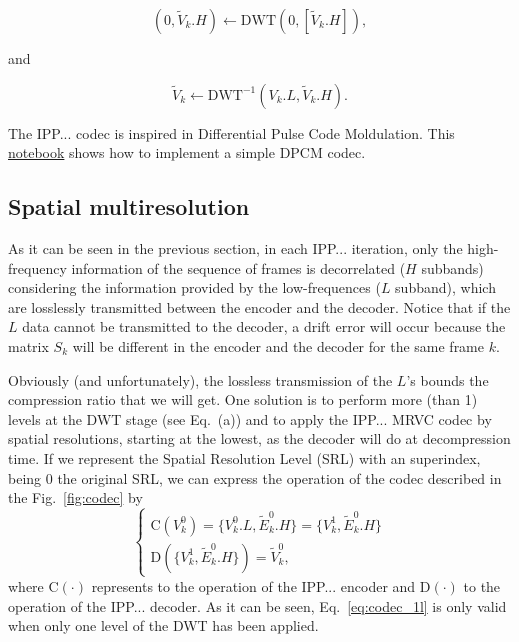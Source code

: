 \begin{equation}
  (0, \tilde{V}_k.H) \leftarrow \text{DWT}(0, [\tilde{V}_k.H]),
  \tag{j}
\end{equation}

and

\begin{equation}
  \tilde{V}_k \leftarrow \text{DWT}^{-1}(V_k.L, \tilde{V}_k.H).
  \tag{k}
\end{equation}

The IPP... codec is inspired in Differential Pulse Code Moldulation.
This
\href{https://github.com/Sistemas-Multimedia/Sistemas-Multimedia.github.io/blob/master/milestones/12-IPP_coding/DPCM.ipynb}{notebook}
shows how to implement a simple DPCM codec.

\subsection{Spatial multiresolution}
As it can be seen in the previous section, in each IPP... iteration,
only the high-frequency information of the sequence of frames is
decorrelated ($H$ subbands) considering the information provided by
the low-frequences ($L$ subband), which are losslessly transmitted
between the encoder and the decoder. Notice that if the $L$ data
cannot be transmitted to the decoder, a drift error will occur because
the matrix $S_k$ will be different in the encoder and the decoder for
the same frame $k$.

Obviously (and unfortunately), the lossless transmission of the $L$'s
bounds the compression ratio that we will get. One solution is to
perform more (than 1) levels at the DWT stage (see Eq.~(a)) and to
apply the IPP... MRVC codec by spatial resolutions, starting at the
lowest, as the decoder will do at decompression time. If we represent
the Spatial Resolution Level (SRL) with an superindex, being 0 the
original SRL, we can express the operation of the codec described in
the Fig.~\ref{fig:codec} by
\begin{equation}
  \left\{
    \begin{array}{l}
      \text{C}(V^0_k) = \{V^0_k.L, \tilde{E}^0_k.H\} = \{V^1_k, \tilde{E}^0_k.H\} \\
      \text{D}(\{V^1_k, \tilde{E}^0_k.H\}) = \tilde{V}^0_k,
    \end{array}
  \right.
  \label{eq:codec_1l}
\end{equation}
where $\text{C}(\cdot)$ represents to the operation of the
IPP... encoder and $\text{D}(\cdot)$ to the operation of the
IPP... decoder. As it can be seen, Eq.~\ref{eq:codec_1l} is only valid
when only one level of the DWT has been applied.

